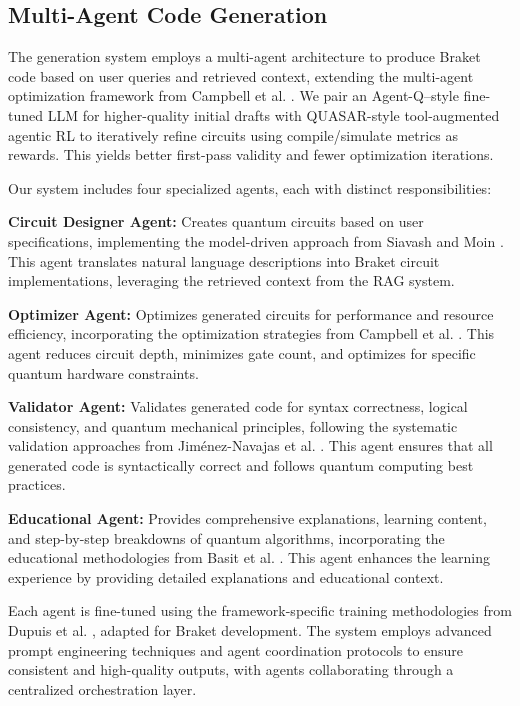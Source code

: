 \documentclass[runningheads]{llncs}
\begin{document}
\subsection{Multi-Agent Code Generation}
The generation system employs a multi-agent architecture to produce Braket code based on user queries and retrieved context, extending the multi-agent optimization framework from Campbell et al. \cite{campbell2025enhancingllmbasedquantumcode}. We pair an Agent-Q–style fine-tuned LLM for higher-quality initial drafts \cite{jern2025agentqfinetuninglargelanguage} with QUASAR-style tool-augmented agentic RL \cite{yu2025quasarquantumassemblycode} to iteratively refine circuits using compile/simulate metrics as rewards. This yields better first-pass validity and fewer optimization iterations.

Our system includes four specialized agents, each with distinct responsibilities:

\textbf{Circuit Designer Agent:} Creates quantum circuits based on user specifications, implementing the model-driven approach from Siavash and Moin \cite{siavash2025modeldrivenquantumcodegeneration}. This agent translates natural language descriptions into Braket circuit implementations, leveraging the retrieved context from the RAG system.

\textbf{Optimizer Agent:} Optimizes generated circuits for performance and resource efficiency, incorporating the optimization strategies from Campbell et al. \cite{campbell2025enhancingllmbasedquantumcode}. This agent reduces circuit depth, minimizes gate count, and optimizes for specific quantum hardware constraints.

\textbf{Validator Agent:} Validates generated code for syntax correctness, logical consistency, and quantum mechanical principles, following the systematic validation approaches from Jiménez-Navajas et al. \cite{jimenez2025codegeneration}. This agent ensures that all generated code is syntactically correct and follows quantum computing best practices.

\textbf{Educational Agent:} Provides comprehensive explanations, learning content, and step-by-step breakdowns of quantum algorithms, incorporating the educational methodologies from Basit et al. \cite{basit2025pennylangpioneeringllmbasedquantum}. This agent enhances the learning experience by providing detailed explanations and educational context.

Each agent is fine-tuned using the framework-specific training methodologies from Dupuis et al. \cite{10691762}, adapted for Braket development. The system employs advanced prompt engineering techniques and agent coordination protocols to ensure consistent and high-quality outputs, with agents collaborating through a centralized orchestration layer.
\end{document}

